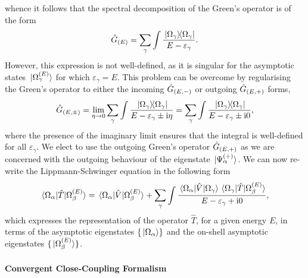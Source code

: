 \documentclass[]{article}
\begin{document}
whence it follows that the spectral decomposition of the Green's operator is of
the form
\begin{equation}
  \label{eq:greens-operator-spectral}
  \hat{G}_{(E)}
  =
  \sum_{\gamma}\int
  \dfrac
  {
    \ketbra*{\Omega_{\gamma}}{\Omega_{\gamma}}
  }
  {
    E
    -
    \varepsilon_{\gamma}
  }
  .
\end{equation}
However, this expression is not well-defined, as it is singular for the
asymptotic states $\ket*{\Omega_{\gamma}^{(E)}}$ for which
$\varepsilon_{\gamma} = E$.
This problem can be overcome by regularising the Green's operator to either the
incoming $\hat{G}_{(E, -)}$ or outgoing $\hat{G}_{(E, +)}$ forms,
\begin{equation}
  \label{eq:greens-operator-regularise}
  \hat{G}_{(E, \pm)}
  =
  \lim_{\eta \to 0}
  \sum_{\gamma}\int
  \dfrac
  {
    \ketbra*{\Omega_{\gamma}}{\Omega_{\gamma}}
  }
  {
    E - \varepsilon_{\gamma} \pm \mathrm{i}\eta
  }
  =
  \sum_{\gamma}\int
  \dfrac
  {
    \ketbra*{\Omega_{\gamma}}{\Omega_{\gamma}}
  }
  {
    E - \varepsilon_{\gamma} \pm \mathrm{i} 0
  }
  ,
\end{equation}
where the presence of the imaginary limit ensures that the integral is
well-defined for all $\varepsilon_{\gamma}$.
We elect to use the outgoing Green's operator $\hat{G}_{(E, +)}$ as we are
concerned with the outgoing behaviour of the eigenstate
$\ket*{\Psi_{\alpha}^{(+)}}$.
We can now re-write the Lippmann-Schwinger equation in the following form
\begin{equation}
  \label{eq:ls-t}
  \mel*
  {\Omega_{\alpha}}
  {\hat{T}}
  {\Omega_{\beta}^{(E)}}
  =
  \mel*
  {\Omega_{\alpha}}
  {\hat{V} }
  {\Omega_{\beta}^{(E)}}
  +
  \sum_{\gamma}\int
  \dfrac
  {
    \mel*
    {\Omega_{\alpha}}
    {\hat{V}}
    {\Omega_{\gamma}}
    \mel*
    {\Omega_{\gamma}}
    {\hat{T}}
    {\Omega_{\beta}^{(E)}}
  }
  {
    E - \varepsilon_{\gamma} + \mathrm{i} 0
  }
  ,
\end{equation}
which expresses the representation of the operator $\hat{T}$, for a given energy
$E$, in terms of the asymptotic eigenstates $\lbrace\ket*{\Omega_{\alpha}}\rbrace$ and
the on-shell asymptotic eigenstates $\lbrace\ket*{\Omega_{\beta}^{(E)}}\rbrace$.

\paragraph{Convergent Close-Coupling Formalism}
\label{sec:th-ccc-eq-form}
\end{document}
